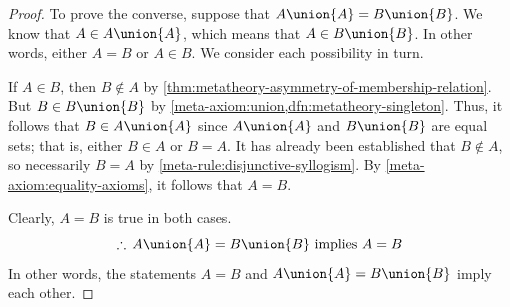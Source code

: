 \begin{proof}
    \vspace{0.3cm}
    \noindent
    To prove the converse, suppose that \( A \union \mleft\{ A \mright\} = B \union \mleft\{ B \mright\} \).
    We know that \( A \in A \union \mleft\{ A \mright\} \), which means that \( A \in B \union \mleft\{ B \mright\} \).
    In other words, either \( A = B \) or \( A \in B \). We consider each possibility in turn.

    \vspace{0.3cm}
    \noindent
    If \( A \in B \), then \( B \notin A \) by \cref{thm:metatheory-asymmetry-of-membership-relation}.
    But \( B \in B \union \mleft\{ B \mright\} \) by \cref{meta-axiom:union,dfn:metatheory-singleton}.
    Thus, it follows that \( B \in A \union \mleft\{ A \mright\} \) since \( A \union \mleft\{ A \mright\} \) and \( B \union \mleft\{ B \mright\} \) are equal sets;
    that is, either \( B \in A \) or \( B = A \).
    It has already been established that \( B \notin A \), so necessarily \( B = A \) by \cref{meta-rule:disjunctive-syllogism}.
    By \cref{meta-axiom:equality-axioms}, it follows that \( A = B \).

    \vspace{0.3cm}
    \noindent
    Clearly, \( A = B \) is true in both cases.
    \begin{equation*}
        \therefore \, A \union \mleft\{ A \mright\} = B \union \mleft\{ B \mright\} \ \text{implies} \ A = B
    \end{equation*}
    In other words, the statements \( A = B \) and \( A \union \mleft\{ A \mright\} = B \union \mleft\{ B \mright\} \) imply each other.
\end{proof}


